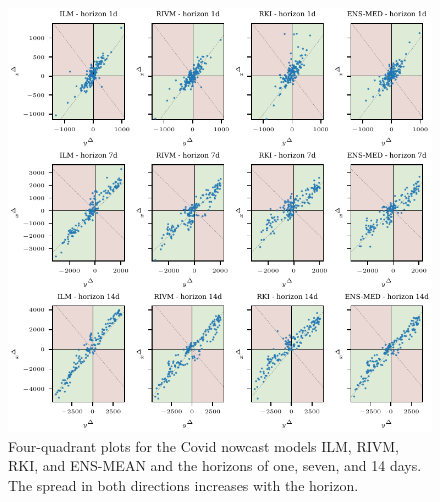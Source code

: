 \documentclass[pdflatex]{sn-jnl}
\theoremstyle{plain}%
\theoremstyle{definition}
\begin{document}
\begin{figure}
\centering
\includegraphics{plots/covid_nowcast/30_4q_plots}
\caption[Four-quadrant plots for the Covid nowcast models ILM, RIVM, RKI, and ENS-MEAN and the horizons of one, seven, and 14 days.]{Four-quadrant plots for the Covid nowcast models ILM, RIVM, RKI, and ENS-MEAN and the horizons of one, seven, and 14 days. The spread in both directions increases with the horizon. }
\label{fig:app-covid-4q}
\end{figure}
\end{document}

